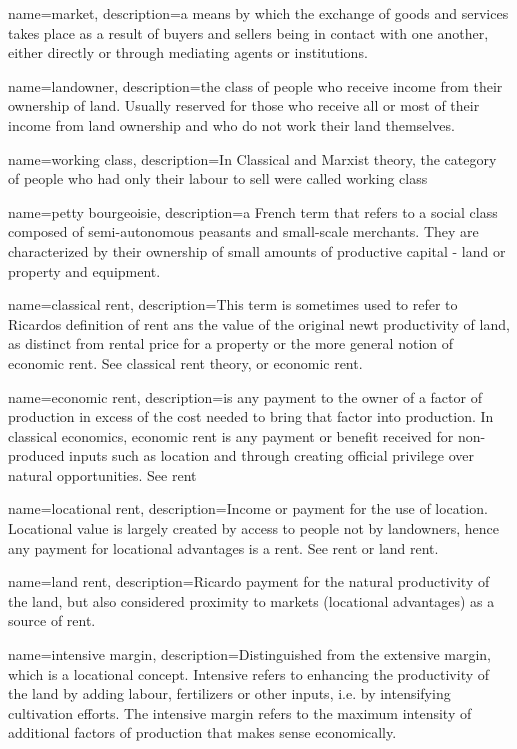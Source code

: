 {
name=market,
description={a means by which the exchange of goods and services takes place as a result of buyers and sellers being in contact with one another, either directly or through mediating agents or institutions.}%
}

{
name=landowner,
description={the class of people who receive income from their ownership of land. Usually reserved for those who receive all or most of their income from land ownership and who do not work their land themselves.}
}

{
name=working class,
description={In Classical and Marxist theory, the category of people who had only their labour to sell were called working class}
}


{
name=petty bourgeoisie,
description={a French term that refers to a social class composed of semi-autonomous peasants and small-scale merchants. They are characterized by their ownership of small amounts of productive capital - land or property and equipment.}
}

{
name=classical rent,
description={This term is sometimes used to refer to Ricardos definition of rent ans the value of the original newt productivity of land, as distinct from rental price for a property or the more general notion of economic rent. See \gls{classical rent theory}, or \gls{economic rent}.}
}

{
name=economic rent,
description={is any payment to the owner of a factor of production in excess of the cost needed to bring that factor into production. In classical economics, economic rent is any payment  or benefit received for non-produced inputs such as location  and through creating official privilege over natural opportunities. See \gls{rent}}
}

{
name=locational rent,
description={Income or payment for the use of location. Locational value is largely created by access to people not by landowners, hence any payment for locational advantages is a rent. See \gls{rent} or \gls{land rent}.}
}

{
name=land rent,
description={Ricardo payment for  the natural productivity of the land, but also considered proximity to markets (locational advantages) as a source of rent. }
}

{
name=intensive margin,
description={Distinguished from the \gls{extensive margin}, which is a locational concept. Intensive refers to  enhancing the productivity of  the land by adding labour, fertilizers or other inputs, i.e. by intensifying cultivation efforts.  The intensive margin refers to the maximum intensity of additional factors of production that makes sense economically. }
}

